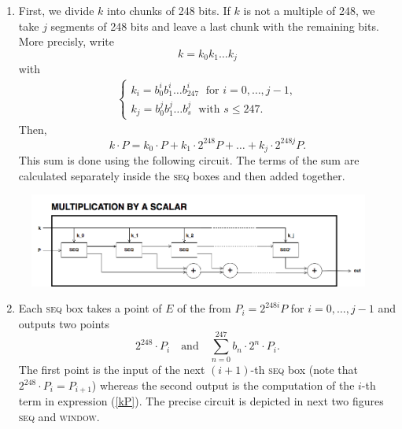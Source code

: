 \documentclass{article}
\theoremstyle{definition}
\theoremstyle{remark}
\begin{document}
\begin{spacing}{1.2}
\begin{multicols}{2}
\begin{enumerate}
	\item First, we divide $k$ into chunks of 248 bits. If $k$ is not a multiple of 248, %
	we take $j$ segments of 248 bits and leave a last chunk with the remaining bits. More precisly, write 
		$$ k = k_0 k_1 \dots k_j $$
	with
		\begin{gather*}
			\begin{cases}
				k_i = b^i_0 b^i_1 \dots b^i_{247} 	\;\text{ for }  i = 0, \dots, j-1, \\
				k_j = b^j_0 b^j_1 \dots b^j_s 	\;\text{ with } s\leq 247.
			\end{cases}
		\end{gather*}
	Then,  
		\begin{equation}\label{kP}
			k\cdot P = k_0\cdot P + k_1\cdot 2^{248}P +\dots+ k_j\cdot 2^{248j}P. 	
		\end{equation}
	This sum is done using the following circuit. The terms of the sum are calculated separately inside the \textsc{seq} boxes and then added together. 
\end{enumerate}		 		
%
\end{multicols}	
\begin{figure}[h]
	\centering
	\includegraphics[scale=0.52]{figures/multiplication.png}
\end{figure}
\begin{multicols}{2}
%
\begin{enumerate}
\setcounter{enumi}{1}
	\item Each \textsc{seq} box takes a point of $E$ of the from $P_i = 2^{248 i} P$ for $i=0,\dots,j-1$ and outputs two points %
	$$ 	2^{248} \cdot P_i 
		\quad \text{and} \quad
		\sum_{n = 0}^{247} b_n \cdot 2^{n} \cdot P_i. 
	$$
	The first point is the input of the next $(i+1)$-th \textsc{seq} box (note that $ 2^{248} \cdot P_i = P_{i+1}$) whereas the second output is the computation of the $i$-th term in expression (\ref{kP}). The precise circuit is depicted in next two figures \textsc{seq} and \textsc{window}.
	\vspace{-0.4cm}
	

\end{enumerate}
\end{multicols}
\end{spacing}
\end{document}
